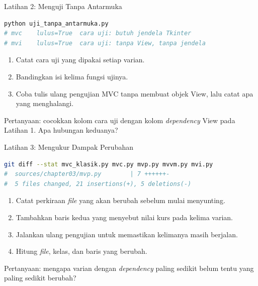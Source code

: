 \documentclass[aspectratio=169, table, 12pt]{beamer}
\begin{document}
\begin{frame}[fragile]{{\Large Latihan 2: Menguji Tanpa Antarmuka}}
  \vspace{3pt}
\begin{lstlisting}[language=bash, basicstyle=\ttfamily\tiny]
python uji_tanpa_antarmuka.py
# mvc    lulus=True  cara uji: butuh jendela Tkinter
# mvi    lulus=True  cara uji: tanpa View, tanpa jendela
\end{lstlisting}

  \vspace{3pt}
  \begin{enumerate}
    \item Catat cara uji yang dipakai setiap varian.
    \item Bandingkan isi kelima fungsi ujinya.
    \item Coba tulis ulang pengujian MVC tanpa membuat objek View, lalu catat
          apa yang menghalangi.
  \end{enumerate}

  \vspace{3pt}
  {\small Pertanyaan: cocokkan kolom cara uji dengan kolom \textit{dependency} View
  pada Latihan 1. Apa hubungan keduanya?}
\end{frame}

\begin{frame}[fragile]{{\Large Latihan 3: Mengukur Dampak Perubahan}}
  \vspace{3pt}
\begin{lstlisting}[language=bash, basicstyle=\ttfamily\tiny]
git diff --stat mvc_klasik.py mvc.py mvp.py mvvm.py mvi.py
#  sources/chapter03/mvp.py        | 7 ++++++-
#  5 files changed, 21 insertions(+), 5 deletions(-)
\end{lstlisting}

  \vspace{3pt}
  \begin{enumerate}
    \item Catat perkiraan \textit{file} yang akan berubah sebelum mulai menyunting.
    \item Tambahkan baris kedua yang menyebut nilai kurs pada kelima varian.
    \item Jalankan ulang pengujian untuk memastikan kelimanya masih berjalan.
    \item Hitung \textit{file}, kelas, dan baris yang berubah.
  \end{enumerate}

  \vspace{3pt}
  {\small Pertanyaan: mengapa varian dengan \textit{dependency} paling sedikit belum
  tentu yang paling sedikit berubah?}
\end{frame}
\end{document}
